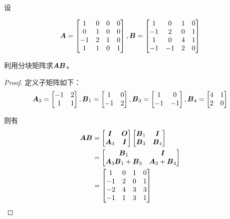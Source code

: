 \begin{problem}\label{problem-1.24}
设

\begin{equation*}
    \boldsymbol{A}=\begin{bmatrix}1&0&0&0\\0&1&0&0\\-1&2&1&0\\1&1&0&1\end{bmatrix},
    \boldsymbol{B}=\begin{bmatrix}1&0&1&0\\-1&2&0&1\\1&0&4&1\\-1&-1&2&0\end{bmatrix}
\end{equation*}

利用分块矩阵求\(\boldsymbol{A}\boldsymbol{B}\)。
\end{problem}
\begin{proof}
    定义子矩阵如下：
    \begin{equation*}
        \boldsymbol{A}_3=
        \begin{bmatrix}
            -1 & 2 \\1&1
        \end{bmatrix},
        \boldsymbol{B}_1=
        \begin{bmatrix}
            1 & 0 \\-1&2
        \end{bmatrix},
        \boldsymbol{B}_3=
        \begin{bmatrix}
            1 & 0 \\-1&-1
        \end{bmatrix},
        \boldsymbol{B}_4=
        \begin{bmatrix}
            4 & 1 \\2&0
        \end{bmatrix}
    \end{equation*}

    则有
    \begin{align*}
        \boldsymbol{A}\boldsymbol{B} & =
        \begin{bmatrix}
            \boldsymbol{I} & \boldsymbol{O} \\\boldsymbol{A}_3&\boldsymbol{I}
        \end{bmatrix}
        \begin{bmatrix}
            \boldsymbol{B}_1 & \boldsymbol{I} \\\boldsymbol{B}_3&\boldsymbol{B}_4
        \end{bmatrix}                        \\&=
        \begin{bmatrix}
            \boldsymbol{B}_1 & \boldsymbol{I} \\\boldsymbol{A}_3\boldsymbol{B}_1+\boldsymbol{B}_3&\boldsymbol{A}_3+\boldsymbol{B}_4
        \end{bmatrix} \\&=
        \begin{bmatrix}
            1  & 0 & 1 & 0 \\
            -1 & 2 & 0 & 1 \\
            -2 & 4 & 3 & 3 \\
            -1 & 1 & 3 & 1
        \end{bmatrix}
    \end{align*}
\end{proof}

